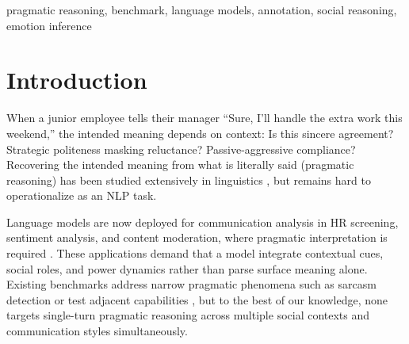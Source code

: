 \documentclass[twoside,11pt]{article}
\begin{document}
\begin{abstract}
Pragmatic reasoning---inferring intended meaning beyond literal semantics---underpins everyday communication yet remains difficult for large language models. We present the Contextual Emotional Inference (CEI) Benchmark: 300 human-validated scenarios for evaluating how well LLMs disambiguate pragmatically complex utterances. Each scenario pairs a situational context and speaker-listener roles (with explicit power relations) against an ambiguous utterance. The dataset covers five pragmatic subtypes (sarcasm/irony, mixed signals, strategic politeness, passive aggression, deflection/misdirection) drawn from workplace, family, social, and service settings, with three power configurations (peer, higher$\rightarrow$lower, lower$\rightarrow$higher). Three trained annotators independently labeled every scenario. Inter-annotator agreement (Fleiss' $\kappa = 0.06$--$0.25$ by subtype) is low but expected: pragmatic inference admits multiple valid readings, and the disagreement itself is informative. We describe our annotation methodology, including a 4-level quality control pipeline that combines automated statistical checks with expert adjudication. CEI is released under CC-BY-4.0.
\end{abstract}

\begin{keywords}
pragmatic reasoning, benchmark, language models, annotation, social reasoning, emotion inference
\end{keywords}

\section{Introduction}
\label{sec:intro}

When a junior employee tells their manager ``Sure, I'll handle the extra work this weekend,'' the intended meaning depends on context: Is this sincere agreement? Strategic politeness masking reluctance? Passive-aggressive compliance? Recovering the intended meaning from what is literally said (pragmatic reasoning) has been studied extensively in linguistics \citep{grice1975logic,sperber1986relevance}, but remains hard to operationalize as an NLP task.

Language models are now deployed for communication analysis in HR screening, sentiment analysis, and content moderation, where pragmatic interpretation is required \citep{liang2022holistic}. These applications demand that a model integrate contextual cues, social roles, and power dynamics rather than parse surface meaning alone. Existing benchmarks address narrow pragmatic phenomena such as sarcasm detection \citep{ghosh2020semeval} or test adjacent capabilities \citep{sap2019socialiqa,le2019revisiting}, but to the best of our knowledge, none targets single-turn pragmatic reasoning across multiple social contexts and communication styles simultaneously.
\end{document}
